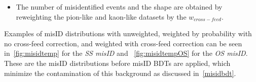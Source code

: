 \begin {itemize}
\begin{itemize}
\item For each event in both kaon-like and pion-like sample, $w_{cross-feed}$ = probability of being misidentified particle including the cross-contamination correction is 
	calculated 
\begin{equation}
w_{cross-feed}=\frac{n(p, \eta)^{final}_{\pi} \times M(p, \eta)_{\pi\rightarrow\mu}}{{N(p, \eta)}^{0}_{\pi}},
\end{equation}
\begin{equation}
w_{cross-feed}=\frac{n(p, \eta)^{final}_{K} \times M(p, \eta)_{K\rightarrow\mu}}{{N(p, \eta)}^{0}_{K}}.
\end{equation}
\end{itemize}

\item The number of misidentified events and the shape are obtained by reweighting the pion-like and kaon-like datasets by the $w_{cross-feed}$. 
	
\end{itemize}

Examples of misID distributions with unweighted, weighted by probability with no cross-feed correction, and weighted with cross-feed correction can be seen in~\autoref{fig:misidtemp} for the \textit{SS misID} and ~\autoref{fig:misidtempOS} for the \textit{OS misID}. These are the misID distributions before misID BDTs are applied, which minimize the contamination of this background as discussed in~\autoref{misidbdt}. 

